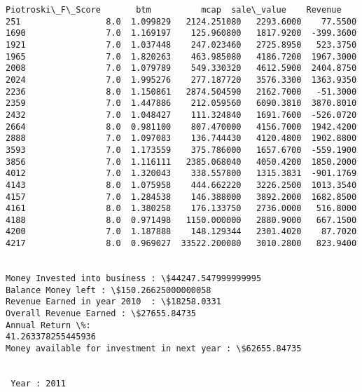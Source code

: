 \documentclass[11pt]{article}
\begin{document}
\begin{Verbatim}[commandchars=\\\{\}]
      Piotroski\_F\_Score       btm          mcap  sale\_value    Revenue
251                 8.0  1.099829   2124.251080   2293.6000    77.5500
1690                7.0  1.169197    125.960800   1817.9200  -399.3600
1921                7.0  1.037448    247.023460   2725.8950   523.3750
1965                7.0  1.820263    463.985080   4186.7200  1967.3000
2008                7.0  1.079789    549.330320   4612.5900  2404.8750
2024                7.0  1.995276    277.187720   3576.3300  1363.9350
2236                8.0  1.150861   2874.504590   2162.7000   -51.3000
2359                7.0  1.447886    212.059560   6090.3810  3870.8010
2432                7.0  1.048427    111.324840   1691.7600  -526.0720
2664                8.0  0.981100    807.470000   4156.7000  1942.4200
2888                7.0  1.097083    136.744430   4120.4800  1902.8800
3593                7.0  1.173559    375.786000   1657.6700  -559.1900
3856                7.0  1.116111   2385.068040   4050.4200  1850.2000
4012                7.0  1.320043    338.557800   1315.3831  -901.1769
4143                8.0  1.075958    444.662220   3226.2500  1013.3540
4157                7.0  1.284538    146.388000   3892.2000  1682.8500
4161                8.0  1.380258    176.133750   2736.0000   516.8000
4188                8.0  0.971498   1150.000000   2880.9000   667.1500
4200                7.0  1.187888    148.129344   2301.4020    87.7020
4217                8.0  0.969027  33522.200080   3010.2800   823.9400


Money Invested into business : \$44247.547999999995
Balance Money left : \$150.26625000000058
Revenue Earned in year 2010  : \$18258.0331
Overall Revenue Earned : \$27655.84735
Annual Return \%:
41.263378255445936
Money available for investment in next year : \$62655.84735


 Year : 2011


\end{Verbatim}
\end{document}
